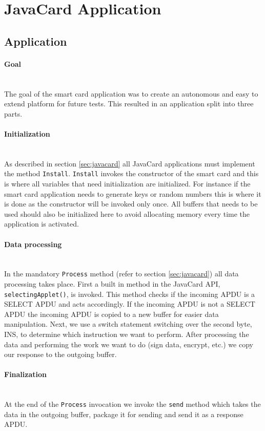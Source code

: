 \section{JavaCard Application}
\subsection{Application}
\paragraph{Goal}\mbox{}\\
The goal of the smart card application was to create an autonomous and easy to extend platform for future tests. This resulted in an application split into three parts.

\paragraph{Initialization}\mbox{}\\
As described in section \ref{sec:javacard} all JavaCard applications must implement the method \texttt{Install}. \texttt{Install} invokes the constructor of the smart card and this is where all variables that need initialization are initialized. For instance if the smart card application needs to generate keys or random numbers this is where it is done as the constructor will be invoked only once. All buffers that needs to be used should also be initialized here to avoid allocating memory every time the application is activated.

\paragraph{Data processing}\mbox{}\\
In the mandatory \texttt{Process} method (refer to section \ref{sec:javacard}) all data processing takes place. First a built in method in the JavaCard API, \texttt{selectingApplet()}, is invoked. This method checks if the incoming APDU is a SELECT APDU and acts accordingly. If the incoming APDU is not a SELECT APDU the incoming APDU is copied to a new buffer for easier data manipulation. Next, we use a switch statement switching over the second byte, INS, to determine which instruction we want to perform. After processing the data and performing the work we want to do (sign data, encrypt, etc.) we copy our response to the outgoing buffer.

\paragraph{Finalization}\mbox{}\\
At the end of the \texttt{Process} invocation we invoke the \texttt{send} method which takes the data in the outgoing buffer, package it for sending and send it as a response APDU.

